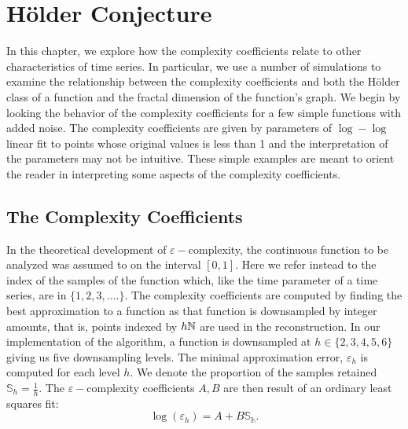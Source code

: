 \chapter{H\"older Conjecture} 
% 

In this chapter, we explore how the complexity coefficients relate to other characteristics of time series. In particular, we use a number of simulations to examine the relationship between the complexity coefficients and both the H\"older class of a function and the fractal dimension of the function's graph. We begin by looking the behavior of
the complexity coefficients for a few simple functions with added noise. The complexity coefficients are given by parameters of $\log-\log$ linear fit to points whose original values is less than 1 and the interpretation of the parameters may not be intuitive. These simple examples are meant to orient the reader in interpreting some aspects of the complexity coefficients.  


\section{The Complexity Coefficients}
In the theoretical development of $\varepsilon-$complexity, 
the continuous function to be analyzed was assumed to on 
the interval $[0,1]$. Here we refer instead to the index
of the samples of the function which, like the time 
parameter of a time series, are in $\{ 1,2,3,.... \}$.
The complexity coefficients are computed by finding the best approximation to a function as that function is downsampled by integer amounts, that is, points indexed by $h\mathbb{N}$ are used in the reconstruction. In our implementation of the algorithm, a function is downsampled at $h \in \{ 2,3,4,5,6 \}$ giving us 
five downsampling levels. The minimal approximation error, $\varepsilon_h$ is computed for each level $h$. We denote the  proportion of the samples retained $\mathbb{S}_h = \frac{1}{h}$.
The $\varepsilon-$complexity coefficients $A, B$ are then result of an ordinary least squares fit: 
\[
     \log(\varepsilon_h) = A + B \mathbb{S_h}.
\]


